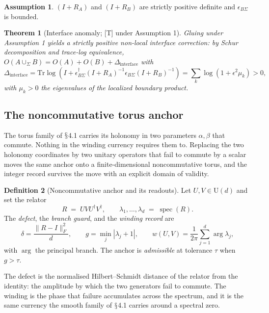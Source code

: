 \documentclass[11pt]{article}
\theoremstyle{definition}
\newtheorem{definition}{Definition}[section]
\newtheorem{assumption}{Assumption}
\theoremstyle{plain}
\newtheorem{theorem}[definition]{Theorem}
\begin{document}
\begin{assumption}
$(I+R_A)$ and $(I+R_B)$ are strictly positive definite and $\epsilon_{B\Sigma}$ is
bounded.
\end{assumption}

\begin{theorem}[Interface anomaly; {[T]} under Assumption 1]
Gluing under Assumption 1 yields a strictly positive non-local interface
correction: by Schur decomposition and trace-log equivalence,
$O(A \cup_\Sigma B) = O(A) + O(B) + \Delta_{\mathrm{interface}}$ with
\begin{equation}
\Delta_{\mathrm{interface}} = \mathrm{Tr}\log\!\left(I +
\epsilon^{\dagger}_{B\Sigma}(I+R_A)^{-1}\epsilon_{B\Sigma}(I+R_B)^{-1}\right)
= \sum_k \log(1 + \epsilon^2\mu_k) > 0,
\end{equation}
with $\mu_k > 0$ the eigenvalues of the localized boundary product.
\end{theorem}

\subsection{The noncommutative torus anchor}

The torus family of $\mathsection$4.1 carries its holonomy in two parameters $\alpha,\beta$
that commute. Nothing in the winding currency requires them to. Replacing the two
holonomy coordinates by two unitary operators that fail to commute by a scalar
moves the same anchor onto a finite-dimensional noncommutative torus, and the
integer record survives the move with an explicit domain of validity.

\begin{definition}[Noncommutative anchor and its readouts]
Let $U,V \in \mathrm{U}(d)$ and set the relator
\begin{equation}
R \;=\; U V U^{\dagger} V^{\dagger}, \qquad
\lambda_1,\dots,\lambda_d \;=\; \operatorname{spec}(R).
\end{equation}
The \emph{defect}, the \emph{branch guard}, and the \emph{winding record} are
\begin{equation}
\delta = \frac{\|R-I\|_F^{2}}{d}, \qquad
g = \min_j |\lambda_j + 1|, \qquad
w(U,V) = \frac{1}{2\pi}\sum_{j=1}^{d} \arg \lambda_j ,
\end{equation}
with $\arg$ the principal branch. The anchor is \emph{admissible} at tolerance
$\tau$ when $g > \tau$.
\end{definition}

The defect is the normalised Hilbert--Schmidt distance of the relator from the
identity: the amplitude by which the two generators fail to commute. The winding is
the phase that failure accumulates across the spectrum, and it is the same currency
the smooth family of $\mathsection$4.1 carries around a spectral zero.
\end{document}
